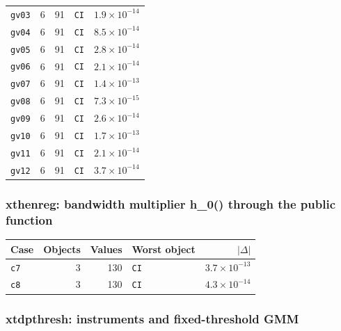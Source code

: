 \begin{longtable}{@{}p{3.6cm}rrp{4.9cm}r@{}}
\texttt{gv03} & 6 & 91 & \texttt{CI} & $1.9\times10^{-14}$ \\
\texttt{gv04} & 6 & 91 & \texttt{CI} & $8.5\times10^{-14}$ \\
\texttt{gv05} & 6 & 91 & \texttt{CI} & $2.8\times10^{-14}$ \\
\texttt{gv06} & 6 & 91 & \texttt{CI} & $2.1\times10^{-14}$ \\
\texttt{gv07} & 6 & 91 & \texttt{CI} & $1.4\times10^{-13}$ \\
\texttt{gv08} & 6 & 91 & \texttt{CI} & $7.3\times10^{-15}$ \\
\texttt{gv09} & 6 & 91 & \texttt{CI} & $2.6\times10^{-14}$ \\
\texttt{gv10} & 6 & 91 & \texttt{CI} & $1.7\times10^{-13}$ \\
\texttt{gv11} & 6 & 91 & \texttt{CI} & $2.1\times10^{-14}$ \\
\texttt{gv12} & 6 & 91 & \texttt{CI} & $3.7\times10^{-14}$ \\
\bottomrule
\end{longtable}

\subsubsection*{xthenreg: bandwidth multiplier h\_0() through the public function}

\begin{longtable}{@{}p{3.6cm}rrp{4.9cm}r@{}}
\toprule
Case & Objects & Values & Worst object & $|\Delta|$ \\
\midrule
\endhead
\texttt{c7} & 3 & 130 & \texttt{CI} & $3.7\times10^{-13}$ \\
\texttt{c8} & 3 & 130 & \texttt{CI} & $4.3\times10^{-14}$ \\
\bottomrule
\end{longtable}

\subsubsection*{xtdpthresh: instruments and fixed-threshold GMM}

